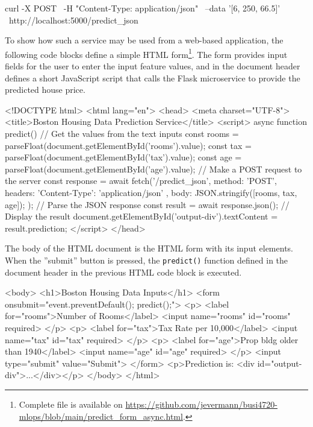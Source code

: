 \begin{bashcode}
curl -X POST \
     -H "Content-Type: application/json" \
     --data '[6, 250, 66.5]' \
     http://localhost:5000/predict_json
\end{bashcode}

To show how such a service may be used from a web-based application, the following code blocks define a simple HTML form\footnote{Complete file is available on \url{https://github.com/jevermann/busi4720-mlops/blob/main/predict_form_async.html}.}. The form provides input fields for the user to enter the input feature values, and in the document header defines a short JavaScript script that calls the Flask microservice to provide the predicted house price. 

\begin{htmlcode}
<!DOCTYPE html>
<html lang="en">
 <head>
  <meta charset="UTF-8">
   <title>Boston Housing Data Prediction Service</title>
   <script>
    async function predict() {
     // Get the values from the text inputs
     const rooms = parseFloat(document.getElementById('rooms').value);
     const tax = parseFloat(document.getElementById('tax').value);
     const age = parseFloat(document.getElementById('age').value);
     // Make a POST request to the server
     const response = await fetch('/predict_json', {
       method: 'POST',
       headers: { 'Content-Type': 'application/json' },
       body: JSON.stringify([rooms, tax, age]);
     });
     // Parse the JSON response
     const result = await response.json();
     // Display the result
     document.getElementById('output-div').textContent
       = result.prediction;
   }
  </script>
 </head>
\end{htmlcode}

The body of the HTML document is the HTML form with its input elements. When the ''submit'' button is pressed, the \texttt{predict()} function defined in the document header in the previous HTML code block is executed. 

\begin{htmlcode}
 <body>
  <h1>Boston Housing Data Inputs</h1>
  <form onsubmit="event.preventDefault(); predict();">
   <p>
    <label for="rooms">Number of Rooms</label>
    <input name="rooms" id="rooms" required>
   </p>
   <p>
    <label for="tax">Tax Rate per 10,000</label>
    <input name="tax" id="tax" required>
   </p>
   <p>
    <label for="age">Prop bldg older than 1940</label>
    <input name="age" id="age" required>
   </p>
   <input type="submit" value="Submit">
  </form>
  <p>Prediction is: <div id="output-div">...</div></p>
 </body>
</html>
\end{htmlcode}

